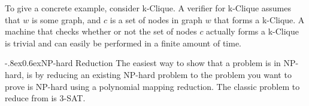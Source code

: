 \documentclass[10pt,landscape]{article}
\makeatletter
\renewcommand{\subsection}{\@startsection{subsection}{2}{0pt}%
                           {-.8ex}{0.6ex}{\normalfont\normalsize\bfseries}}
\makeatother
\begin{document}
\begin{multicols*}{3}
To give a concrete example, consider k-Clique. A verifier for k-Clique assumes
that $w$ is some graph, and $c$ is a set of nodes in graph $w$ that forms
a k-Clique. A machine that checks whether or not the set of nodes $c$ actually
forms a k-Clique is trivial and can easily be performed in a finite amount of
time.

\subsection{NP-hard Reduction}
The easiest way to show that a problem is in NP-hard, is by reducing an existing
NP-hard problem to the problem you want to prove is NP-hard using a polynomial  
mapping reduction. The classic problem to reduce from is 3-SAT.


\end{multicols*}
\end{document}
